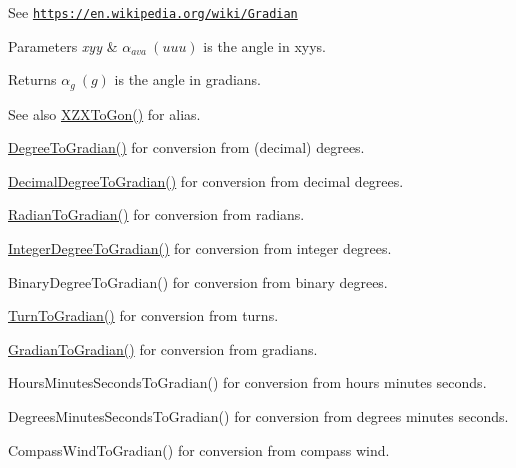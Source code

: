 See \href{https://en.wikipedia.org/wiki/Gradian}{\tt https\+://en.\+wikipedia.\+org/wiki/\+Gradian} 
\begin{DoxyParams}{Parameters}
{\em xyy} & $\alpha_{ava}\ (uuu)$ is the angle in xyys. \\
\hline
\end{DoxyParams}
\begin{DoxyReturn}{Returns}
$\alpha_{g}\ (g)$ is the angle in gradians. 
\end{DoxyReturn}
\begin{DoxySeeAlso}{See also}
\mbox{\hyperlink{group___e_g_x_math-_angle_conversions-_x_z_x_ga5b73732dd6ff688b3aa07629fc9acb44}{X\+Z\+X\+To\+Gon()}} for alias. 

\mbox{\hyperlink{group___e_g_x_math-_angle_conversions-_degree_ga25bb5506b3f66fff7a1b85bf7bd795b3}{Degree\+To\+Gradian()}} for conversion from (decimal) degrees. 

\mbox{\hyperlink{group___e_g_x_math-_angle_conversions-_decimal_degree_ga3ac6f1ceb36a4938cdf3b55554734c99}{Decimal\+Degree\+To\+Gradian()}} for conversion from decimal degrees. 

\mbox{\hyperlink{group___e_g_x_math-_angle_conversions-_radian_ga3c1607eae50cbf0186c42485bb3878d5}{Radian\+To\+Gradian()}} for conversion from radians. 

\mbox{\hyperlink{group___e_g_x_math-_angle_conversions-_integer_degree_ga47127467ff7a8ef57f6be9ce496a97df}{Integer\+Degree\+To\+Gradian()}} for conversion from integer degrees. 

Binary\+Degree\+To\+Gradian() for conversion from binary degrees. 

\mbox{\hyperlink{group___e_g_x_math-_angle_conversions-_turn_gad6aa9bdde2cde17cec136b24ee017bba}{Turn\+To\+Gradian()}} for conversion from turns. 

\mbox{\hyperlink{group___e_g_x_math-_angle_conversions-_gradian_ga0dcd5b58c4073a9df5e0a210aca307ce}{Gradian\+To\+Gradian()}} for conversion from gradians. 

Hours\+Minutes\+Seconds\+To\+Gradian() for conversion from hours minutes seconds. 

Degrees\+Minutes\+Seconds\+To\+Gradian() for conversion from degrees minutes seconds. 

Compass\+Wind\+To\+Gradian() for conversion from compass wind. 
\end{DoxySeeAlso}
\mbox{\label{group___e_g_x_math-_angle_conversions-_x_z_x_ga3f52a8fe8ff0da0ebf9f05bb482b6a17}} 
